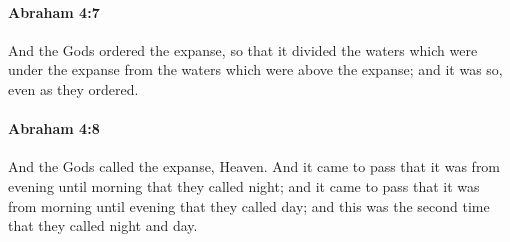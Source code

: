 
		\paragraph{Abraham 4:7} %
			\label{ABRAHAM-4-7}

			And the Gods ordered the expanse, so that it divided the waters which were under the expanse from the waters which were above the expanse; and it was so, even as they ordered.


		\paragraph{Abraham 4:8} %
			\label{ABRAHAM-4-8}

			And the Gods called the expanse, Heaven.  And it came to pass that it was from evening until morning that they called night; and it came to pass that it was from morning until evening that they called day; and this was the second time that they called night and day.

